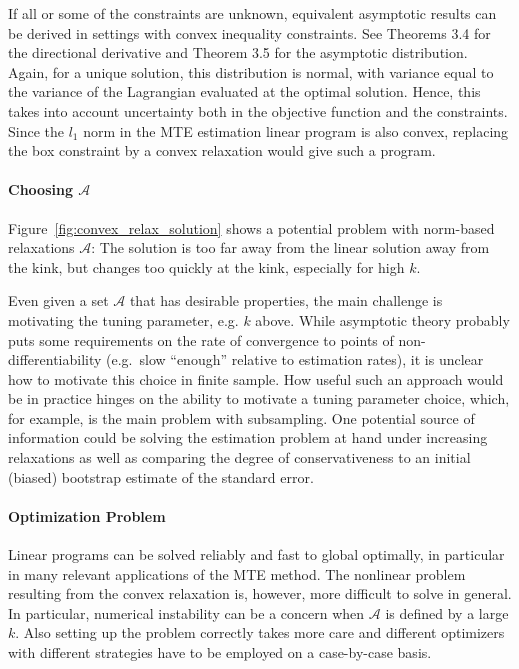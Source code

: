 \documentclass[12pt,a4paper,english]{article} %
\numberwithin{equation}{section}
\theoremstyle{definition}
\theoremstyle{remark}
\theoremstyle{plain}
\begin{document}
If all or some of the constraints are unknown, equivalent asymptotic results can be derived in settings with convex inequality constraints.
See Theorems 3.4 for the directional derivative and Theorem 3.5 for the asymptotic distribution.
Again, for a unique solution, this distribution is normal, with variance equal to the variance of the Lagrangian evaluated at the optimal solution.
Hence, this takes into account uncertainty both in the objective function and the constraints.
Since the $l_1$ norm in the MTE estimation linear program is also convex, replacing the box constraint by a convex relaxation would give such a program.

\paragraph{Choosing $\mathcal{A}$}
Figure~\ref{fig:convex_relax_solution} shows a potential problem with norm-based relaxations $\mathcal{A}$:
The solution is too far away from the linear solution away from the kink, but changes too quickly at the kink, especially for high $k$.

Even given a set $\mathcal{A}$ that has desirable properties, the main challenge is motivating the tuning parameter, e.g. $k$ above.
While asymptotic theory probably puts some requirements on the rate of convergence to points of non-differentiability (e.g.\ slow ``enough'' relative to estimation rates), it is unclear how to motivate this choice in finite sample.
How useful such an approach would be in practice hinges on the ability to motivate a tuning parameter choice, which, for example, is the main problem with subsampling.
One potential source of information could be solving the estimation problem at hand under increasing relaxations as well as comparing the degree of conservativeness to an initial (biased) bootstrap estimate of the standard error.

\paragraph{Optimization Problem}
Linear programs can be solved reliably and fast to global optimally, in particular in many relevant applications of the MTE method.
The nonlinear problem resulting from the convex relaxation is, however, more difficult to solve in general.
In particular, numerical instability can be a concern when $\mathcal{A}$ is defined by a large $k$.
Also setting up the problem correctly takes more care and different optimizers with different strategies have to be employed on a case-by-case basis.
\end{document}
